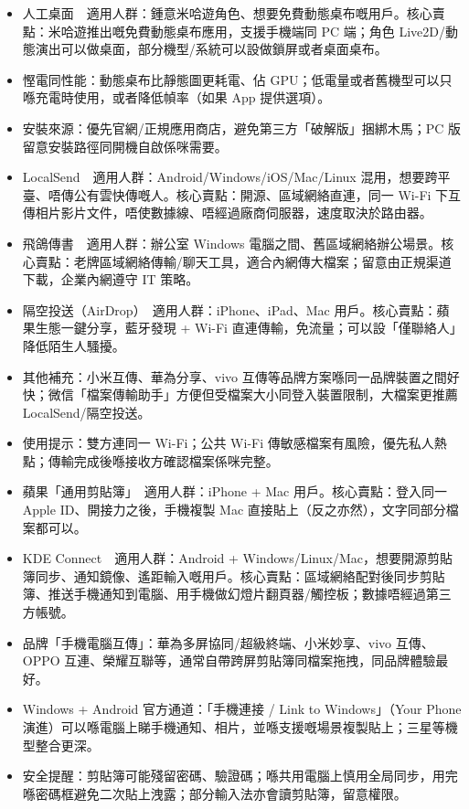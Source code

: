 
\begin{itemize}
  \item 人工桌面　適用人群：鍾意米哈遊角色、想要免費動態桌布嘅用戶。核心賣點：米哈遊推出嘅免費動態桌布應用，支援手機端同 PC 端；角色 Live2D/動態演出可以做桌面，部分機型/系統可以設做鎖屏或者桌面桌布。
  \item 慳電同性能：動態桌布比靜態圖更耗電、佔 GPU；低電量或者舊機型可以只喺充電時使用，或者降低幀率（如果 App 提供選項）。
  \item 安裝來源：優先官網/正規應用商店，避免第三方「破解版」捆綁木馬；PC 版留意安裝路徑同開機自啟係咪需要。
\end{itemize}


\begin{itemize}
  \item LocalSend　適用人群：Android/Windows/iOS/Mac/Linux 混用，想要跨平臺、唔傳公有雲快傳嘅人。核心賣點：開源、區域網絡直連，同一 Wi-Fi 下互傳相片影片文件，唔使數據線、唔經過廠商伺服器，速度取決於路由器。
  \item 飛鴿傳書　適用人群：辦公室 Windows 電腦之間、舊區域網絡辦公場景。核心賣點：老牌區域網絡傳輸/聊天工具，適合內網傳大檔案；留意由正規渠道下載，企業內網遵守 IT 策略。
  \item 隔空投送（AirDrop）　適用人群：iPhone、iPad、Mac 用戶。核心賣點：蘋果生態一鍵分享，藍牙發現 + Wi-Fi 直連傳輸，免流量；可以設「僅聯絡人」降低陌生人騷擾。
  \item 其他補充：小米互傳、華為分享、vivo 互傳等品牌方案喺同一品牌裝置之間好快；微信「檔案傳輸助手」方便但受檔案大小同登入裝置限制，大檔案更推薦 LocalSend/隔空投送。
  \item 使用提示：雙方連同一 Wi-Fi；公共 Wi-Fi 傳敏感檔案有風險，優先私人熱點；傳輸完成後喺接收方確認檔案係咪完整。
\end{itemize}


\begin{itemize}
  \item 蘋果「通用剪貼簿」　適用人群：iPhone + Mac 用戶。核心賣點：登入同一 Apple ID、開接力之後，手機複製 Mac 直接貼上（反之亦然），文字同部分檔案都可以。
  \item KDE Connect　適用人群：Android + Windows/Linux/Mac，想要開源剪貼簿同步、通知鏡像、遙距輸入嘅用戶。核心賣點：區域網絡配對後同步剪貼簿、推送手機通知到電腦、用手機做幻燈片翻頁器/觸控板；數據唔經過第三方帳號。
  \item 品牌「手機電腦互傳」：華為多屏協同/超級終端、小米妙享、vivo 互傳、OPPO 互連、榮耀互聯等，通常自帶跨屏剪貼簿同檔案拖拽，同品牌體驗最好。
  \item Windows + Android 官方通道：「手機連接 / Link to Windows」（Your Phone 演進）可以喺電腦上睇手機通知、相片，並喺支援嘅場景複製貼上；三星等機型整合更深。
  \item 安全提醒：剪貼簿可能殘留密碼、驗證碼；喺共用電腦上慎用全局同步，用完喺密碼框避免二次貼上洩露；部分輸入法亦會讀剪貼簿，留意權限。
\end{itemize}

